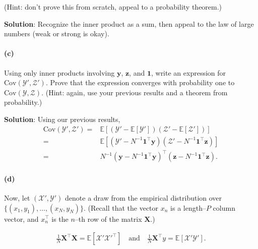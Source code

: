 \documentclass[
  letterpaper,
  DIV=11,
  numbers=noendperiod]{scrartcl}
\let\oldparagraph\paragraph
\renewcommand{\paragraph}[1]{\oldparagraph{#1}\mbox{}}
\begin{document}
(Hint: don't prove this from scratch, appeal to a probability theorem.)

\textbf{Solution}: Recognize the inner product as a sum, then appeal to
the law of large numbers (weak or strong is okay).

\hypertarget{c-2}{%
\paragraph{(c)}\label{c-2}}

Using only inner products involving \(\boldsymbol{y}\),
\(\boldsymbol{z}\), and \(\boldsymbol{1}\), write an expression for
\(\mathrm{Cov}\left(\mathcal{Y}', \mathcal{Z}'\right)\). Prove that the
expression converges with probability one to
\(\mathrm{Cov}\left(\mathcal{Y}, \mathcal{Z}\right)\). (Hint: again, use
your previous results and a theorem from probability.)

\textbf{Solution}: Using our previous results, \[
\begin{aligned}
\mathrm{Cov}\left(\mathcal{Y}', \mathcal{Z}'\right) ={}&
    \mathbb{E}\left[(\mathcal{Y}' - \mathbb{E}\left[\mathcal{Y}'\right])(\mathcal{Z}' - \mathbb{E}\left[\mathcal{Z}'\right])\right] \\
={}&
    \mathbb{E}\left[(\mathcal{Y}' - N^{-1} \boldsymbol{1}^\intercal\boldsymbol{y})(\mathcal{Z}' - N^{-1} \boldsymbol{1}^\intercal\boldsymbol{z})\right] \\
={}&
    N^{-1} (\boldsymbol{y}- N^{-1} \boldsymbol{1}^\intercal\boldsymbol{y})^\intercal(\boldsymbol{z}- N^{-1} \boldsymbol{1}^\intercal\boldsymbol{z}).
\end{aligned}
\]

\hypertarget{d}{%
\paragraph{(d)}\label{d}}

Now, let \((\mathcal{X}', \mathcal{Y}')\) denote a draw from the
empirical distribution over \(\{(x_1, y_1), \ldots, (x_N, y_N) \}\).
(Recall that the vector \(x_n\) is a length--\(P\) column vector, and
\(x_n^\intercal\) is the \(n\)--th row of the matrix
\(\boldsymbol{X}\).)

\[
\begin{aligned}
\frac{1}{N} \boldsymbol{X}^\intercal\boldsymbol{X}= \mathbb{E}\left[\mathcal{X}' \mathcal{X}'^\intercal\right]
\quad\textrm{and}\quad
\frac{1}{N} \boldsymbol{X}^\intercal y= \mathbb{E}\left[\mathcal{X}' \mathcal{Y}'\right].
\end{aligned}
\]
\end{document}
